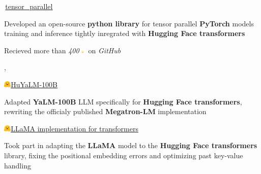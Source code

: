 
\begin{cventries}
  \cventry
    {} %
    {\,\faGithub\acvHeaderIconSep\href{https://github.com/BlackSamorez/tensor_parallel}{tensor\_parallel}} %
    {} %
    {} %
    {
      \begin{cvitems} %
        \item { Developed an open-source \textbf{python library} for tensor parallel \textbf{PyTorch} models training and inference tightly inregrated with \textbf{Hugging Face transformers} }
        \item { Recieved more than \textit{400}\includegraphics[width=3.5mm]{image.png} on \textit{GitHub} }
      \end{cvitems}
    },

  \cventry
    {} %
    {\includegraphics[width=3.5mm]{hf.jpg}\acvHeaderIconSep\href{https://huggingface.co/BlackSamorez/HuYaLM-100B-fp16}{HuYaLM-100B}} %
    {} %
    {} %
    {
      \begin{cvitems} %
        \item { Adapted \textbf{YaLM-100B} LLM specifically for \textbf{Hugging Face transformers}, rewriting the officialy published \textbf{Megatron-LM} implementation }
      \end{cvitems}
    }

  \cventry
    {} %
    {\includegraphics[width=3.5mm]{hf.jpg}\acvHeaderIconSep\href{https://huggingface.co/docs/transformers/main/model_doc/llama}{LLaMA implementation for transformers}} %
    {} %
    {} %
    {
      \begin{cvitems} %
        \item {Took part in adapting the \textbf{LLaMA} model to the \textbf{Hugging Face transformers} library, fixing the positional embedding errors and optimizing past key-value handling}
      \end{cvitems}
    }
    

\end{cventries}
